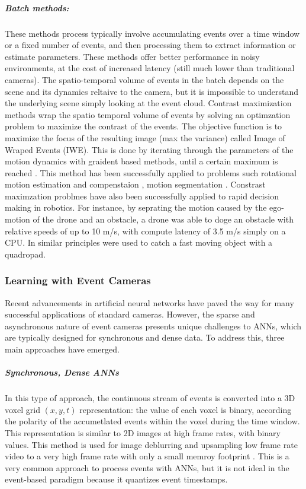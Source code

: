 \documentclass{article}
\begin{document}
\subparagraph{Batch methods:} These methods process typically involve accumulating events over a time window or a fixed number of events, and then processing them to extract information or estimate parameters. These methods offer better performance in noisy environments, at the cost of increased latency (still much lower than traditional cameras). The spatio-temporal volume of events in the batch depends on the scene and its dynamics reltaive to the camera, but it is impossible to understand the underlying scene simply looking at the event cloud. Contrast maximization methods wrap the spatio temporal volume of events by solving an optimzation problem to maximize the contrast of the events. The objective function is to maximize the focus of the resulting image (max the variance) called Image of Wraped Events (IWE). This is done by iterating through the parameters of the motion dynamics with graident based methods, until a certain maximum is reached \cite{gallegoUnifyingContrastMaximization2018a, gallegoEventbasedVisionSurvey2022, gallegoFocusAllYou2019}. This method has been successfully applied to problems such rotational motion estimation and compenstaion \cite{gallegoAccurateAngularVelocity2017,xingEROAMEventbasedCamera2024}, motion segmentation \cite{stoffregenEventBasedMotionSegmentation2019}. Constrast maximzation problmes have also been successfully applied to rapid decision making in robotics. For instance, by seprating the motion caused by the ego-motion of the drone and an obstacle, a drone was able to doge an obstacle with relative speeds of up to 10 m/s, with compute latency of 3.5 m/s simply on a CPU. In \cite{forraiEventbasedAgileObject2023} similar principles were used to catch a fast moving object with a quadropad.

\subsubsection{Learning with Event Cameras} Recent advancements in artificial neural networks have paved the way for many successful applications of standard cameras. However, the sparse and asynchronous nature of event cameras presents unique challenges to ANNs, which are typically designed for synchronous and dense data. To address this, three main approaches have emerged.

\subparagraph{Synchronous, Dense ANNs} In this type of approach, the continuous stream of events is converted into a 3D voxel grid $(x,y,t)$ representation: the value of each voxel is binary, according the polarity of the accumetlated events within the voxel during the time window. This representation is similar to 2D images at high frame rates, with binary values. This method is used for image deblurring and upsampling low frame rate video to a very high frame rate with only a small memroy footprint \cite{tulyakovTimeLensEventbasedVideo2021}. This is a very common approach to process events with ANNs, but it is not ideal in the event-based paradigm because it quantizes event timestamps. 
\end{document}
